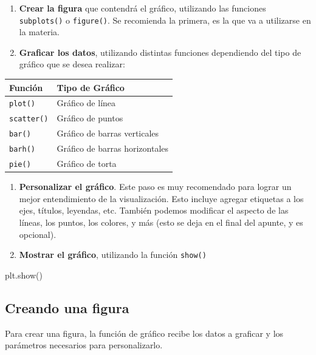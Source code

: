 \documentclass[
  letterpaper,
  DIV=11,
  numbers=noendperiod]{scrreprt}
\newenvironment{Shaded}{\begin{snugshade}}{\end{snugshade}}
\newcommand{\NormalTok}[1]{\textcolor[rgb]{0.00,0.23,0.31}{#1}}
\begin{document}
\begin{enumerate}
\def\labelenumi{\arabic{enumi}.}
\item
  \textbf{Crear la figura} que contendrá el gráfico, utilizando las
  funciones \texttt{subplots()} o \texttt{figure()}. Se recomienda la
  primera, es la que va a utilizarse en la materia.
\item
  \textbf{Graficar los datos}, utilizando distintas funciones
  dependiendo del tipo de gráfico que se desea realizar:
\end{enumerate}

\begin{longtable}[]{@{}ll@{}}
\toprule\noalign{}
Función & Tipo de Gráfico \\
\midrule\noalign{}
\endhead
\bottomrule\noalign{}
\endlastfoot
\texttt{plot()} & Gráfico de línea \\
\texttt{scatter()} & Gráfico de puntos \\
\texttt{bar()} & Gráfico de barras verticales \\
\texttt{barh()} & Gráfico de barras horizontales \\
\texttt{pie()} & Gráfico de torta \\
\end{longtable}

\begin{enumerate}
\def\labelenumi{\arabic{enumi}.}
\setcounter{enumi}{2}
\item
  \textbf{Personalizar el gráfico}. Este paso es muy recomendado para
  lograr un mejor entendimiento de la visualización. Esto incluye
  agregar etiquetas a los ejes, títulos, leyendas, etc. También podemos
  modificar el aspecto de las líneas, los puntos, los colores, y más
  (esto se deja en el final del apunte, y es opcional).
\item
  \textbf{Mostrar el gráfico}, utilizando la función \texttt{show()}
\end{enumerate}

\begin{Shaded}
\begin{Highlighting}[]
\NormalTok{plt.show()}
\end{Highlighting}
\end{Shaded}

\subsection{Creando una figura}\label{creando-una-figura}

Para crear una figura, la función de gráfico recibe los datos a graficar
y los parámetros necesarios para personalizarlo.
\end{document}
